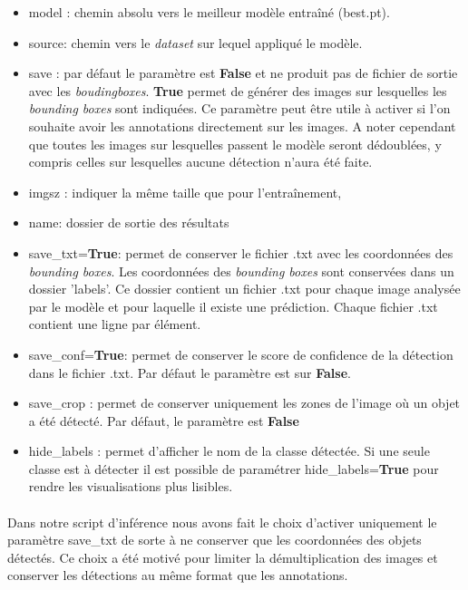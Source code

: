 \documentclass[12pt,twoside]{book}
\begin{document}
\begin{itemize}
    \item model : chemin absolu vers le meilleur modèle entraîné (best.pt). 
    \item source: chemin vers le \textit{dataset} sur lequel appliqué le modèle.
    \item	save : par défaut le paramètre est \textbf{False} et ne produit pas de fichier de sortie avec les \textit{boudingboxes}. \textbf{True} permet de générer des images sur lesquelles les \textit{bounding boxes} sont indiquées. Ce paramètre peut être utile à activer si l’on souhaite avoir les annotations directement sur les images. A noter cependant que toutes les images sur lesquelles passent le modèle seront dédoublées, y compris celles sur lesquelles aucune détection n’aura été faite. 
    \item imgsz : indiquer la même taille que pour l'entraînement,
    \item name: dossier de sortie des résultats
    \item save\_txt=\textbf{True}: permet de conserver le fichier .txt avec les coordonnées des \textit{bounding boxes}. Les coordonnées des \textit{bounding boxes} sont conservées dans un dossier 'labels'. Ce dossier contient un fichier .txt pour chaque image analysée par le modèle et pour laquelle il existe une prédiction. Chaque fichier .txt contient une ligne par élément.
    \item save\_conf=\textbf{True}: permet de conserver le score de confidence de la détection dans le fichier .txt. Par défaut le paramètre est sur \textbf{False}.
    \item save\_crop : permet de conserver uniquement les zones de l’image où un objet a été détecté. Par défaut, le paramètre est \textbf{False}
	\item hide\_labels : permet d’afficher le nom de la classe détectée. Si une seule classe est à détecter il est possible de paramétrer hide\_labels=\textbf{True} pour rendre les visualisations plus lisibles. 
\end{itemize}

\paragraph{}
Dans notre script d’inférence nous avons fait le choix d’activer uniquement le paramètre save\_txt de sorte à ne conserver que les coordonnées des objets détectés. Ce choix a été motivé pour limiter la démultiplication des images et conserver les détections au même format que les annotations. 
\end{document}
